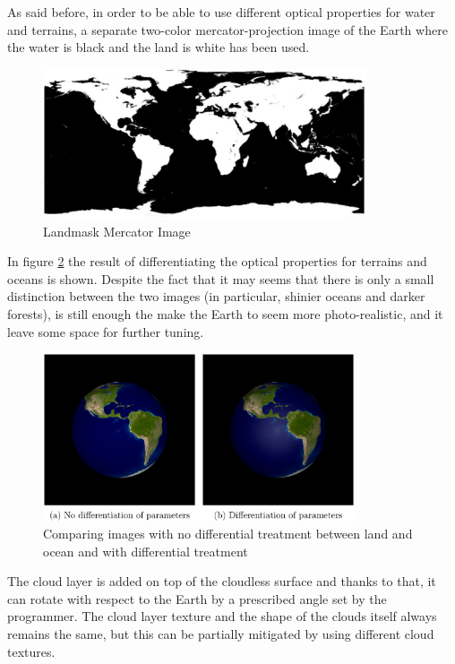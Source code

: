 As said before, in order to be able to use different optical properties for water and terrains, a separate two-color mercator-projection image of the Earth where the water is black and the land is white has been used.

\begin{figure}[htbp]
  \centering
  \includegraphics[width=0.85\textwidth]{gfx/landmask_mercator.eps}
  \caption{Landmask Mercator Image}
  \label{fig:LandmaskMercator}
\end{figure}

In figure \ref{fig:comparisonEarths} the result of differentiating the optical properties for terrains and oceans is shown. Despite the fact that it may seems that there is only a small distinction between the two images (in particular, shinier oceans and darker forests), is still enough the make the Earth to seem more photo-realistic, and it leave some space for further tuning.

\begin{figure}[htbp]
  \centering
  \includegraphics[width=0.82\textwidth]{gfx/comparisonEarths.eps}
  \caption{Comparing images with no differential treatment between land
    and ocean and with differential treatment}
  \label{fig:comparisonEarths}
\end{figure}

The cloud layer is added on top of the cloudless surface and thanks to that, it can rotate with respect to the Earth by a prescribed angle set by the programmer. The cloud layer texture and the shape of the clouds itself always remains the same, but this can be partially mitigated by using different cloud textures.

